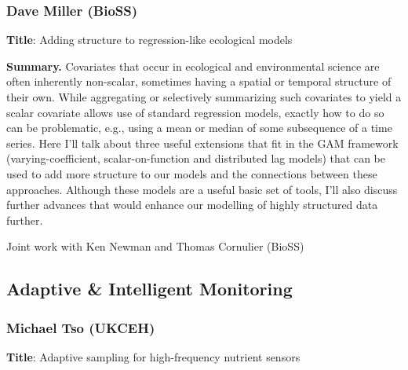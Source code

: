 \documentclass[
  11pt,
  letterpaper,
  DIV=11,
  numbers=noendperiod]{scrartcl}
\begin{document}
\subsubsection[\textbf{Dave Miller} (BioSS) \\Adding structure to regression-like ecological models]{Dave Miller (BioSS)}

\textbf{Title}: Adding structure to regression-like ecological models

\textbf{Summary.} Covariates that occur in ecological and environmental
science are often inherently non-scalar, sometimes having a spatial or
temporal structure of their own. While aggregating or selectively
summarizing such covariates to yield a scalar covariate allows use of
standard regression models, exactly how to do so can be problematic,
e.g., using a mean or median of some subsequence of a time series. Here
I'll talk about three useful extensions that fit in the GAM framework
(varying-coefficient, scalar-on-function and distributed lag models)
that can be used to add more structure to our models and the connections
between these approaches. Although these models are a useful basic set
of tools, I'll also discuss further advances that would enhance our
modelling of highly structured data further.

Joint work with Ken Newman and Thomas Cornulier (BioSS)

\subsection{Adaptive \& Intelligent
Monitoring}\label{adaptive-intelligent-monitoring}

\subsubsection[\textbf{Michael Tso} (UKCEH) \\Adaptive sampling for high-frequency nutrient sensors ]{Michael Tso (UKCEH)}

\textbf{Title}: Adaptive sampling for high-frequency nutrient sensors
\end{document}
